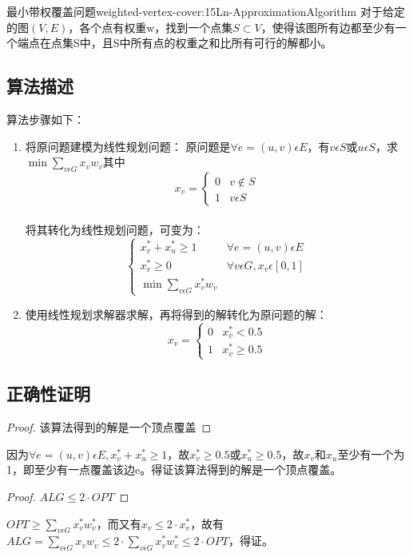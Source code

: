 \begin{definition}{最小带权覆盖问题}{weighted-vertex-cover:15Ln-ApproximationAlgorithm}
	对于给定的图$(V,E)$，各个点有权重w，找到一个点集$S\subset V$，使得该图所有边都至少有一个端点在点集S中，且S中所有点的权重之和比所有可行的解都小。
\end{definition}

\subsection{算法描述}

算法步骤如下：
\begin{enumerate}
	\item 将原问题建模为线性规划问题：
	原问题是$\forall e=(u,v)\epsilon E$，有$v\epsilon S$或$u\epsilon S$，求$\min \sum\limits_{v\epsilon G} x_vw_v$其中
	\[
		x_v = \begin{cases}
			0 & v\notin S \\
			1 & v\epsilon S
		\end{cases}
	\]\\
	将其转化为线性规划问题，可变为：
	\[
		\begin{cases}
			x_v^*+x_u^*\geqslant 1 			   &\forall e=(u,v)\epsilon E\\
			x_v^*\geqslant 0	   			   &\forall v\epsilon G, x_v\epsilon [0,1]\\
			\min \sum\limits_{v\epsilon G} x_v^*w_v
		\end{cases}
	\]
	\item 使用线性规划求解器求解，再将得到的解转化为原问题的解：
	\[
		x_v=\begin{cases}
			0 &x_v^*<0.5\\
			1 &x_v^*\geqslant 0.5
		\end{cases}
	\]
\end{enumerate}

\subsection{正确性证明}

\begin{proof}
	该算法得到的解是一个顶点覆盖
\end{proof}
	因为$\forall e=(u,v)\epsilon E,x_v^*+x_u^*\geqslant 1$，故$x_v^*\geqslant 0.5$或$x_u^*\geqslant 0.5$，故$x_v$和$x_u$至少有一个为1，即至少有一点覆盖该边e。得证该算法得到的解是一个顶点覆盖。
\begin{proof}
	$ALG\leqslant 2\cdot OPT$
\end{proof}
	$OPT\geqslant \sum\limits_{v\epsilon G} x_v^*w_v^*$，而又有$x_v\leqslant 2\cdot x_v^*$，故有
	$ALG=\sum\limits_{v\epsilon G} x_vw_v\leqslant 2\cdot \sum\limits_{v\epsilon G} x_v^*w_v^*\leqslant 2\cdot OPT$，得证。

